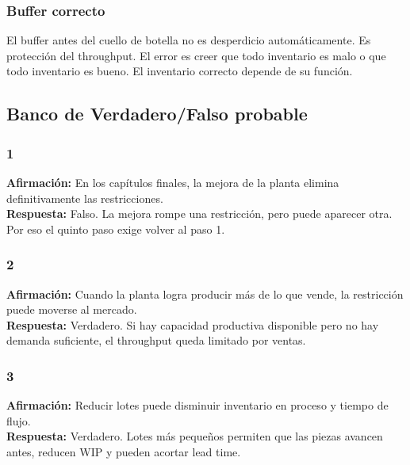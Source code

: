 \documentclass[
  11pt,
]{article}
\begin{document}
\hypertarget{buffer-correcto}{%
\subsubsection{Buffer correcto}\label{buffer-correcto}}

El buffer antes del cuello de botella no es desperdicio automáticamente.
Es protección del throughput. El error es creer que todo inventario es
malo o que todo inventario es bueno. El inventario correcto depende de
su función.

\hypertarget{banco-de-verdaderofalso-probable}{%
\subsection{Banco de Verdadero/Falso
probable}\label{banco-de-verdaderofalso-probable}}

\hypertarget{section}{%
\subsubsection{1}\label{section}}

\textbf{Afirmación:} En los capítulos finales, la mejora de la planta
elimina definitivamente las restricciones.\\
\textbf{Respuesta:} Falso. La mejora rompe una restricción, pero puede
aparecer otra. Por eso el quinto paso exige volver al paso 1.

\hypertarget{section-1}{%
\subsubsection{2}\label{section-1}}

\textbf{Afirmación:} Cuando la planta logra producir más de lo que
vende, la restricción puede moverse al mercado.\\
\textbf{Respuesta:} Verdadero. Si hay capacidad productiva disponible
pero no hay demanda suficiente, el throughput queda limitado por ventas.

\hypertarget{section-2}{%
\subsubsection{3}\label{section-2}}

\textbf{Afirmación:} Reducir lotes puede disminuir inventario en proceso
y tiempo de flujo.\\
\textbf{Respuesta:} Verdadero. Lotes más pequeños permiten que las
piezas avancen antes, reducen WIP y pueden acortar lead time.
\end{document}
